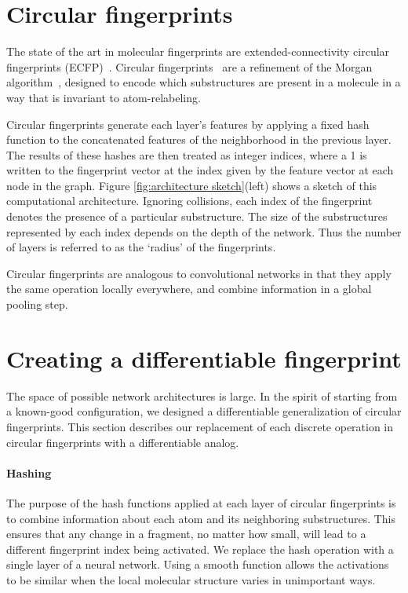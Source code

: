 \documentclass{article}
\newcommand{\citep}{\cite}
\begin{document}
\section{Circular fingerprints}
\vspace{-3mm}
The state of the art in molecular fingerprints are extended-connectivity circular fingerprints (ECFP)~\citep{ECFP2010}.
Circular fingerprints~\citep{glem2006circular} are a refinement of the Morgan algorithm~\citep{morgan1965generation}, designed to encode which substructures are present in a molecule in a way that is invariant to atom-relabeling.

Circular fingerprints generate each layer's features by applying a fixed hash function to the concatenated features of the neighborhood in the previous layer.
The results of these hashes are then treated as integer indices, where a 1 is written to the fingerprint vector at the index given by the feature vector at each node in the graph.
Figure \ref{fig:architecture sketch}(left) shows a sketch of this computational architecture.
Ignoring collisions, each index of the fingerprint denotes the presence of a particular substructure.
The size of the substructures represented by each index depends on the depth of the network.
Thus the number of layers is referred to as the `radius' of the fingerprints.


Circular fingerprints are analogous to convolutional networks in that they apply the same operation locally everywhere,  and combine information in a global pooling step.

\section{Creating a differentiable fingerprint}
\vspace{-3mm}
The space of possible network architectures is large.
In the spirit of starting from a known-good configuration, we designed a differentiable generalization of circular fingerprints.
This section describes our replacement of each discrete operation in circular fingerprints with a differentiable analog.

\paragraph{Hashing}
The purpose of the hash functions applied at each layer of circular fingerprints is to combine information about each atom and its neighboring substructures.
This ensures that any change in a fragment, no matter how small, will lead to a different fingerprint index being activated.
We replace the hash operation with a single layer of a neural network.
Using a smooth function allows the activations to be similar when the local molecular structure varies in unimportant ways.
\end{document}

